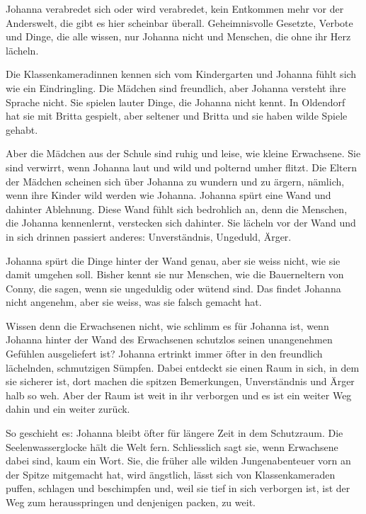 \documentclass[10pt,titlepage,a5paper]{book}
\begin{document}
Johanna verabredet sich oder wird verabredet, kein Entkommen mehr vor der Anderswelt, die gibt es hier scheinbar überall. Geheimnisvolle Gesetzte, Verbote und Dinge, die alle wissen, nur Johanna nicht und Menschen, die ohne ihr Herz lächeln.

Die Klassenkameradinnen kennen sich vom Kindergarten und Johanna fühlt sich wie ein Eindringling. Die Mädchen sind freundlich, aber Johanna versteht ihre Sprache nicht. Sie spielen lauter Dinge, die Johanna nicht kennt. In Oldendorf hat sie mit Britta gespielt, aber seltener und Britta und sie haben wilde Spiele gehabt.

Aber die Mädchen aus der Schule sind ruhig und leise, wie kleine Erwachsene. Sie sind verwirrt, wenn Johanna laut und wild und polternd umher flitzt. Die Eltern der Mädchen scheinen sich über Johanna zu wundern und zu ärgern, nämlich, wenn ihre Kinder wild werden wie Johanna. Johanna spürt eine Wand und dahinter Ablehnung. Diese Wand fühlt sich bedrohlich an, denn die Menschen, die Johanna kennenlernt, verstecken sich dahinter. Sie lächeln vor der Wand und in sich drinnen passiert anderes: Unverständnis, Ungeduld, Ärger. 

Johanna spürt die Dinge hinter der Wand genau, aber sie weiss nicht, wie sie damit umgehen soll. Bisher kennt sie nur Menschen, wie die Bauerneltern von Conny, die sagen, wenn sie ungeduldig oder wütend sind. Das findet Johanna nicht angenehm, aber sie weiss, was sie falsch gemacht hat.

Wissen denn die Erwachsenen nicht, wie schlimm es für Johanna ist, wenn Johanna hinter der Wand des Erwachsenen schutzlos seinen unangenehmen Gefühlen ausgeliefert ist? Johanna ertrinkt immer öfter in den freundlich lächelnden, schmutzigen Sümpfen.  Dabei entdeckt sie einen Raum in sich, in dem sie sicherer ist, dort machen die spitzen Bemerkungen, Unverständnis und Ärger halb so weh. Aber der Raum ist weit in ihr verborgen und es ist ein weiter Weg dahin und ein weiter zurück.

 So geschieht es: Johanna bleibt öfter für längere Zeit in dem Schutzraum. Die Seelenwasserglocke hält die Welt fern. Schliesslich sagt sie, wenn Erwachsene dabei sind, kaum ein Wort. Sie, die früher alle wilden Jungenabenteuer  vorn an der Spitze mitgemacht hat, wird ängstlich, lässt sich von Klassenkameraden puffen, schlagen und beschimpfen und, weil sie tief in sich verborgen ist, ist der Weg zum herausspringen und denjenigen packen, zu weit.
\end{document}
